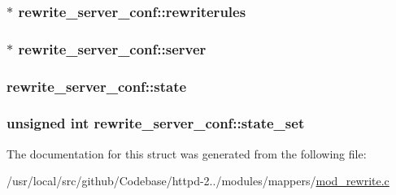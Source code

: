 \subsubsection[{\texorpdfstring{rewriterules}{rewriterules}}]{$\ast$ rewrite\+\_\+server\+\_\+conf\+::rewriterules}\hypertarget{structrewrite__server__conf_aeeb9a7fb15130a67a5ed78b3485dfe3c}{}\label{structrewrite__server__conf_aeeb9a7fb15130a67a5ed78b3485dfe3c}
\subsubsection[{\texorpdfstring{server}{server}}]{$\ast$ rewrite\+\_\+server\+\_\+conf\+::server}\hypertarget{structrewrite__server__conf_a9a120a903a2d831ca8e98907a4c548e2}{}\label{structrewrite__server__conf_a9a120a903a2d831ca8e98907a4c548e2}
\subsubsection[{\texorpdfstring{state}{state}}]{ rewrite\+\_\+server\+\_\+conf\+::state}\hypertarget{structrewrite__server__conf_ada32b9c887543c12dfb62fd0998332c6}{}\label{structrewrite__server__conf_ada32b9c887543c12dfb62fd0998332c6}
\subsubsection[{\texorpdfstring{state\+\_\+set}{state_set}}]{\setlength{\rightskip}{0pt plus 5cm}unsigned {\bf int} rewrite\+\_\+server\+\_\+conf\+::state\+\_\+set}\hypertarget{structrewrite__server__conf_a1362f472bc3884608903641218835a64}{}\label{structrewrite__server__conf_a1362f472bc3884608903641218835a64}


The documentation for this struct was generated from the following file\+:\begin{DoxyCompactItemize}
\item 
/usr/local/src/github/\+Codebase/httpd-\/2../modules/mappers/\hyperlink{mod__rewrite_8c}{mod\+\_\+rewrite.\+c}\end{DoxyCompactItemize}
